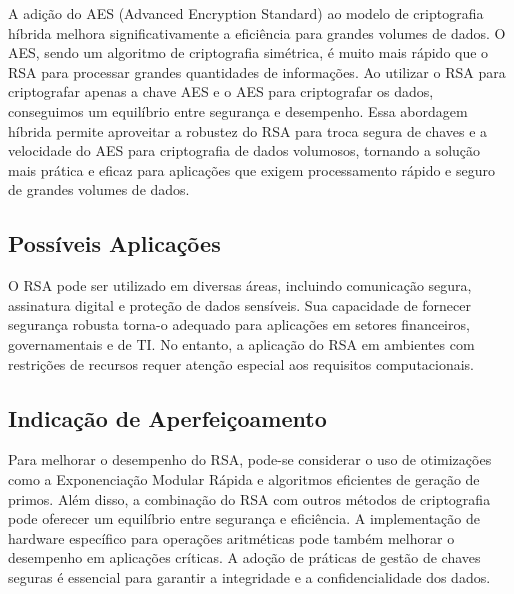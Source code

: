 \documentclass[a4paper,12pt]{article}
\begin{document}
A adição do AES (Advanced Encryption Standard) ao modelo de criptografia híbrida melhora significativamente a eficiência para grandes volumes de dados. O AES, sendo um algoritmo de criptografia simétrica, é muito mais rápido que o RSA para processar grandes quantidades de informações. Ao utilizar o RSA para criptografar apenas a chave AES e o AES para criptografar os dados, conseguimos um equilíbrio entre segurança e desempenho. Essa abordagem híbrida permite aproveitar a robustez do RSA para troca segura de chaves e a velocidade do AES para criptografia de dados volumosos, tornando a solução mais prática e eficaz para aplicações que exigem processamento rápido e seguro de grandes volumes de dados.

\subsection*{Possíveis Aplicações}
O RSA pode ser utilizado em diversas áreas, incluindo comunicação segura, assinatura digital e proteção de dados sensíveis. Sua capacidade de fornecer segurança robusta torna-o adequado para aplicações em setores financeiros, governamentais e de TI. No entanto, a aplicação do RSA em ambientes com restrições de recursos requer atenção especial aos requisitos computacionais.

\subsection*{Indicação de Aperfeiçoamento}
Para melhorar o desempenho do RSA, pode-se considerar o uso de otimizações como a Exponenciação Modular Rápida e algoritmos eficientes de geração de primos. Além disso, a combinação do RSA com outros métodos de criptografia pode oferecer um equilíbrio entre segurança e eficiência. A implementação de hardware específico para operações aritméticas pode também melhorar o desempenho em aplicações críticas. A adoção de práticas de gestão de chaves seguras é essencial para garantir a integridade e a confidencialidade dos dados.
\end{document}
